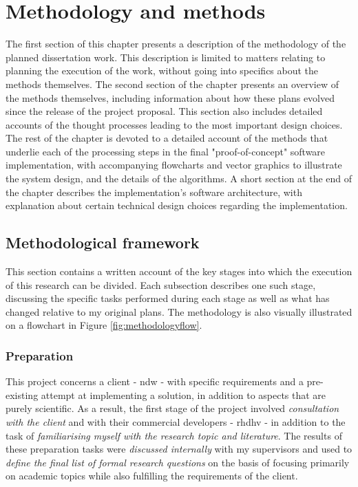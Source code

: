 
\chapter{Methodology and methods}
\label{chap:mm}

The first section of this chapter presents a description of the methodology of the planned dissertation work. This description is limited to matters relating to planning the execution of the work, without going into specifics about the methods themselves. The second section of the chapter presents an overview of the methods themselves, including information about how these plans evolved since the release of the project proposal. This section also includes detailed accounts of the thought processes leading to the most important design choices. The rest of the chapter is devoted to a detailed account of the methods that underlie each of the processing steps in the final "proof-of-concept" software implementation, with accompanying flowcharts and vector graphics to illustrate the system design, and the details of the algorithms. A short section at the end of the chapter describes the implementation's software architecture, with explanation about certain technical design choices regarding the implementation.

\section{Methodological framework}
\label{sec:methodology}

This section contains a written account of the key stages into which the execution of this research can be divided. Each subsection describes one such stage, discussing the specific tasks performed during each stage as well as what has changed relative to my original plans. The methodology is also visually illustrated on a flowchart in Figure \ref{fig:methodologyflow}.

\subsection{Preparation}
\label{sub:preparation}

This project concerns a client - \ac{ndw} - with specific requirements and a pre-existing attempt at implementing a solution, in addition to aspects that are purely scientific. As a result, the first stage of the project involved \textit{consultation with the client} and with their commercial developers - \ac{rhdhv} - in addition to the task of \textit{familiarising myself with the research topic and literature}. The results of these preparation tasks were \textit{discussed internally} with my supervisors and used to \textit{define the final list of formal research questions} on the basis of focusing primarily on academic topics while also fulfilling the requirements of the client.

